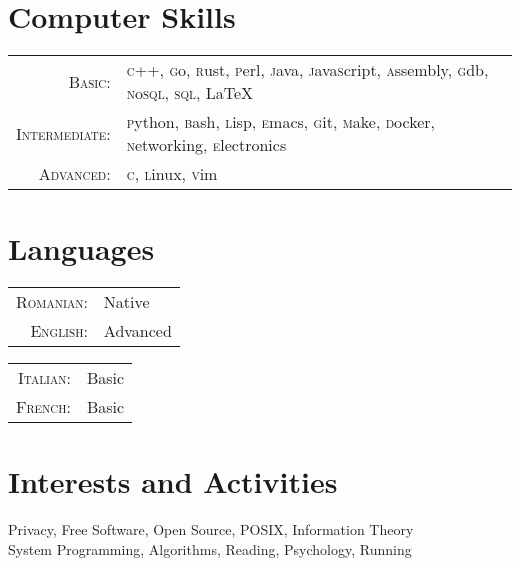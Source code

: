 \documentclass[a4paper,10pt]{article}
\begin{document}
\section{Computer Skills}
\begin{tabular}{rl}
\textsc{Basic:}&
  \textsc{c}++, \textsc{g}o, \textsc{r}ust,
  \textsc{p}erl, \textsc{j}ava, 
  \textsc{j}ava\textsc{s}cript,
  \textsc{a}ssembly, \textsc{g}db, 
  \textsc{n}o\textsc{sql}, \textsc{sql}, 
  \LaTeX\\
\textsc{Intermediate:}&
  \textsc{p}ython, \textsc{b}ash,
  \textsc{l}isp, \textsc{e}macs,
  \textsc{g}it, \textsc{m}ake, 
  \textsc{d}ocker, \textsc{n}etworking,  
  \textsc{e}lectronics\\ 
\textsc{Advanced}:&
  \textsc{c}, \textsc{l}inux, \textsc{v}im\\

\end{tabular}


\section{Languages}
\begin{multicols}{2}
  \begin{tabular}{rl}
    \textsc{Romanian:}&Native\\
    \textsc{English:}&Advanced\\
  \end{tabular}
  \columnbreak
  \begin{tabular}{rl}
    \textsc{Italian:}&Basic\\
    \textsc{French:}&Basic\\
  \end{tabular}
\end{multicols}

\section{Interests and Activities}
Privacy, Free Software, Open Source, POSIX, Information Theory\\
System Programming, Algorithms, Reading, Psychology, Running\\
\end{document}
